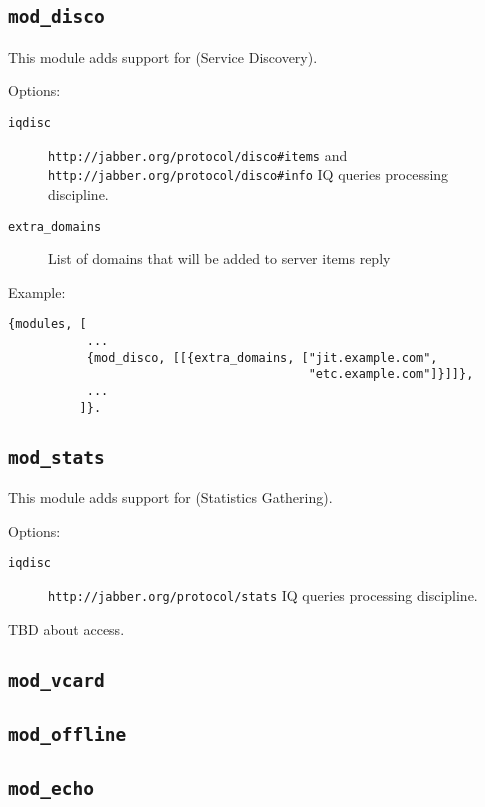 \documentclass[10pt]{article}
\newcommand{\ns}[1]{\texttt{#1}}
\newcommand{\moddisco}{\texttt{mod\_disco}}
\newcommand{\modstats}{\texttt{mod\_stats}}
\newcommand{\modvcard}{\texttt{mod\_vcard}}
\newcommand{\modoffline}{\texttt{mod\_offline}}
\newcommand{\modecho}{\texttt{mod\_echo}}
\begin{document}
\subsection{\moddisco{}}
\label{sec:moddisco}

This module adds support for
 (Service
Discovery).

Options:
\begin{description}
\item[\texttt{iqdisc}] \ns{http://jabber.org/protocol/disco#items} and
  \ns{http://jabber.org/protocol/disco#info} IQ queries processing discipline.
\item[\texttt{extra\_domains}] List of domains that will be added to server
  items reply
\end{description}

Example:
\begin{verbatim}
{modules, [
           ...
           {mod_disco, [[{extra_domains, ["jit.example.com",
                                          "etc.example.com"]}]]},
           ...
          ]}.
\end{verbatim}


\subsection{\modstats{}}
\label{sec:modstats}

This module adds support for
 (Statistics
Gathering).

Options:
\begin{description}
\item[\texttt{iqdisc}] \ns{http://jabber.org/protocol/stats} IQ queries
  processing discipline.
\end{description}

TBD about access.

\subsection{\modvcard{}}
\label{sec:modvcard}



\subsection{\modoffline{}}
\label{sec:modoffline}



\subsection{\modecho{}}
\label{sec:modecho}
\end{document}
